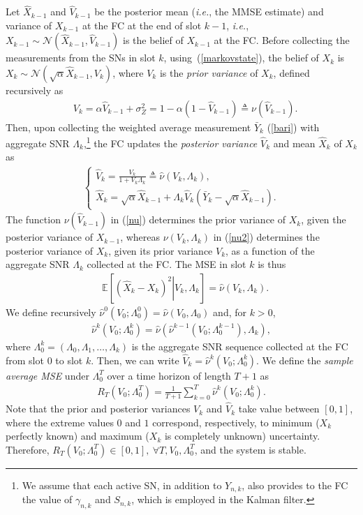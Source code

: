 \documentclass[10pt,twocolumn,twoside]{IEEEtran}
\theoremstyle{plain}
\begin{document}
 Let $\hat X_{k-1}$ and $\hat V_{k-1}$ be the posterior mean (\emph{i.e.}, the MMSE estimate)
and variance of $X_{k-1}$ at the FC at the end of slot $k-1$,
\emph{i.e.}, $X_{k-1}\sim \mathcal N(\hat X_{k-1},\hat V_{k-1})$ is the belief of $X_{k-1}$ at the FC.
 Before collecting the measurements from the SNs in slot $k$,
 using~(\ref{markovstate}),
 the belief of $X_{k}$ is $X_{k}\sim\mathcal N(\sqrt{\alpha} \hat X_{k-1},V_k)$,
 where $V_k$ is the \emph{prior variance} of $X_k$,
defined recursively as
\begin{align}
\label{nu}
&V_k=\alpha \hat V_{k-1}+\sigma_Z^2=
1-\alpha(1-\hat V_{k-1})\triangleq \nu(\hat V_{k-1}).
\end{align}
Then, upon collecting the weighted average measurement $\bar Y_k$ (\ref{bari})
 with aggregate SNR $\Lambda_k$,\footnote{We assume that each active SN, in addition to $Y_{n,k}$, also provides to the FC the value of $\gamma_{n,k}$
and $S_{n,k}$, which is employed in the Kalman filter.}
the FC updates the \emph{posterior variance} $\hat V_k$ and  mean $\hat X_{k}$ of $X_{k}$ as
\begin{align}
\label{nu2}
\left\{\begin{array}{l}
\hat V_k=\frac{V_k}{1+V_k\Lambda_k}
\triangleq \hat \nu(V_{k},\Lambda_k),
\\
\hat X_{k}=\sqrt{\alpha} \hat X_{k-1}+\Lambda_k\hat V_k\left(\bar Y_k -\sqrt{\alpha}\hat X_{k-1}\right).
\end{array}\right.
\end{align}
The function $\nu(\hat V_{k-1})$ in (\ref{nu}) determines  the prior variance of $X_k$, given the posterior variance of $X_{k-1}$,
whereas $\nu(V_k,\Lambda_k)$ in (\ref{nu2}) determines the posterior variance of $X_k$, given its prior variance $V_k$,
as a function of the aggregate SNR $\Lambda_k$ collected at the FC.
The MSE in slot $k$ is thus
\begin{align}
&\mathbb E\left[\left.(\hat X_{k}- X_{k})^2\right|V_{k},\Lambda_k\right]
=\hat \nu(V_{k},\Lambda_k).
\end{align}
We define recursively $\hat\nu^0(V_0;\Lambda_0^{0})=\hat \nu(V_{0},\Lambda_0)$
and, for $k>0$,
\begin{align}
\label{nukrec}
\hat\nu^k(V_0;\Lambda_0^{k})=\hat\nu\left(\hat\nu^{k-1}(V_0;\Lambda_0^{k-1}),\Lambda_k\right),
\end{align}
where $\Lambda_0^k=(\Lambda_0,\Lambda_1,\dots,\Lambda_k)$ is the aggregate SNR sequence collected at the FC
from slot $0$ to slot $k$. Then,
we can write $\hat V_k=\hat\nu^k(V_0;\Lambda_0^{k})$.
We define the \emph{sample average MSE} under $\Lambda_0^T$ over a time horizon of length $T+1$ as
\begin{align}
\label{RT}
R_T(V_0;\Lambda_0^T)=\frac{1}{T+1}\sum_{k=0}^{T}\hat\nu^k(V_0;\Lambda_0^{k}).
\end{align}
Note that the prior and posterior variances $V_k$ and $\hat V_k$ take value between $[0,1]$,
where the extreme values $0$ and $1$ correspond, respectively, to
 minimum ($X_k$ perfectly known) and maximum ($X_k$ is completely unknown) uncertainty.
Therefore, $R_T(V_0;\Lambda_0^T)\in [0,1],\ \forall T,V_0,\Lambda_0^T$, and the system is stable.
\vspace{-4mm}
\end{document}
